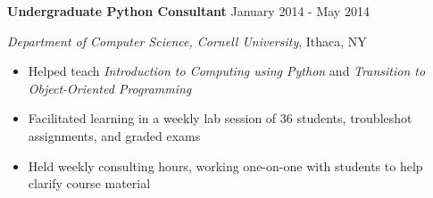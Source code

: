 
\vspace{5pt}

\textbf{Undergraduate Python Consultant} \hfill January 2014 - May 2014

\textit{Department of Computer Science, Cornell University}, Ithaca, NY

\begin{itemize}
    \item Helped teach \textit{Introduction to Computing using Python} and \textit{Transition to Object-Oriented Programming}
    \item Facilitated learning in a weekly lab session of 36 students, troubleshot assignments, and graded exams
    \item Held weekly consulting hours, working one-on-one with students to help clarify course material
\end{itemize}
